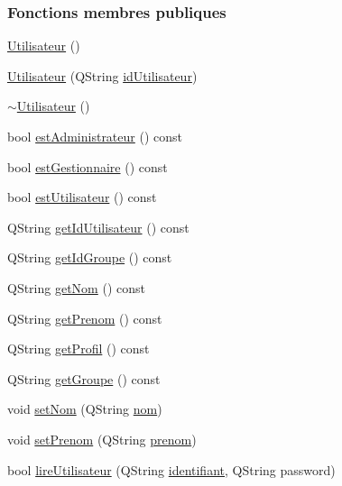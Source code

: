\subsubsection*{Fonctions membres publiques}
\begin{DoxyCompactItemize}
\item 
\hyperlink{class_utilisateur_ae76433a6d353c5f5ad0c6a6af64022ad}{Utilisateur} ()
\item 
\hyperlink{class_utilisateur_aa11337e30b95db151312f65201c61199}{Utilisateur} (Q\+String \hyperlink{class_utilisateur_ae1763e7a52c82c63506bc4160cdabb20}{id\+Utilisateur})
\item 
\hyperlink{class_utilisateur_a6631539ceecd6140fe525eb91485537b}{$\sim$\+Utilisateur} ()
\item 
bool \hyperlink{class_utilisateur_a2c4ede0ec936ebd64d73df1e1dde3a5d}{est\+Administrateur} () const
\item 
bool \hyperlink{class_utilisateur_a3c86ddd77b243fd3f12ad2e85ff06759}{est\+Gestionnaire} () const
\item 
bool \hyperlink{class_utilisateur_a9b01ce9996c2242b1be952c3c7574fac}{est\+Utilisateur} () const
\item 
Q\+String \hyperlink{class_utilisateur_aae4df3c09e4bd421407ea526876a2eaf}{get\+Id\+Utilisateur} () const
\item 
Q\+String \hyperlink{class_utilisateur_a12d3730085761780dd54ffbcf4741721}{get\+Id\+Groupe} () const
\item 
Q\+String \hyperlink{class_utilisateur_adfffec2519ba338497de55b61e7bc420}{get\+Nom} () const
\item 
Q\+String \hyperlink{class_utilisateur_ac4483808ad54888c66a4235133d135d5}{get\+Prenom} () const
\item 
Q\+String \hyperlink{class_utilisateur_a8d838ae68c0be760d6fb4a27d8d7ba08}{get\+Profil} () const
\item 
Q\+String \hyperlink{class_utilisateur_a9922d48c4d295c9357ad8102399322ec}{get\+Groupe} () const
\item 
void \hyperlink{class_utilisateur_aec15176f18c3ae77a04214dd35e917db}{set\+Nom} (Q\+String \hyperlink{class_utilisateur_a1096e809aca4b7cf453a7af93cb72502}{nom})
\item 
void \hyperlink{class_utilisateur_a41e12e2817f4b6ad1fe5ef0f3417caf3}{set\+Prenom} (Q\+String \hyperlink{class_utilisateur_a1dd0779807b19298f30f39d9c371170f}{prenom})
\item 
bool \hyperlink{class_utilisateur_a5911f84daf6d47d7f50e6d16022b292e}{lire\+Utilisateur} (Q\+String \hyperlink{class_utilisateur_a1e79e47202a2c716346f47adbbeb2511}{identifiant}, Q\+String password)
\end{DoxyCompactItemize}
